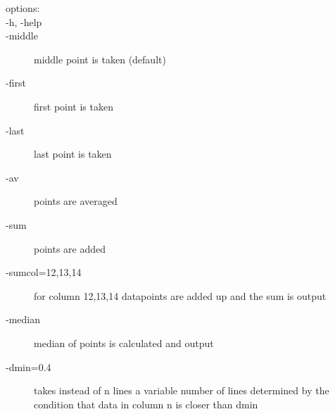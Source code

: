 \begin{description}
\begin{description}
 \item [options:]
  \item[-h, -help]
  \item       [-middle]       middle point is taken (default)
  \item       [-first]       first point is taken 
   \item      [-last]        last point is taken 
   \item      [-av]           points are averaged
   \item      [-sum]           points are added
    \item     [-sumcol=12,13,14]  for column 12,13,14 datapoints are added up and the sum is output
    \item     [-median]       median of points is calculated and output
     \item    [-dmin=0.4]    takes instead of n lines a variable number
                         of lines determined by the condition that
                         data in column n is closer than dmin 
\end{description}       


\end{description}
